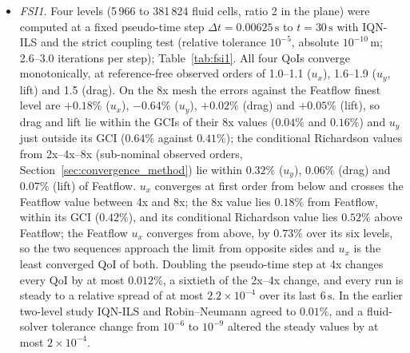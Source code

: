 \begin{itemize}
	\item \emph{FSI1.} Four levels (5\,966 to 381\,824 fluid cells, ratio 2 in the plane) were computed at a fixed pseudo-time step $\Delta t = 0.00625\,\mathrm{s}$ to $t = 30\,\mathrm{s}$ with IQN-ILS and the strict coupling test (relative tolerance $10^{-5}$, absolute $10^{-10}\,\mathrm{m}$; 2.6--3.0 iterations per step); Table~\ref{tab:fsi1}. All four QoIs converge monotonically, at reference-free observed orders of 1.0--1.1 ($u_x$), 1.6--1.9 ($u_y$, lift) and 1.5 (drag). On the 8x mesh the errors against the Featflow finest level are $+0.18\%$ ($u_x$), $-0.64\%$ ($u_y$), $+0.02\%$ (drag) and $+0.05\%$ (lift), so drag and lift lie within the GCIs of their 8x values ($0.04\%$ and $0.16\%$) and $u_y$ just outside its GCI ($0.64\%$ against $0.41\%$); the conditional Richardson values from 2x--4x--8x (sub-nominal observed orders, Section~\ref{sec:convergence_method}) lie within $0.32\%$ ($u_y$), $0.06\%$ (drag) and $0.07\%$ (lift) of Featflow. $u_x$ converges at first order from below and crosses the Featflow value between 4x and 8x; the 8x value lies $0.18\%$ from Featflow, within its GCI ($0.42\%$), and its conditional Richardson value lies $0.52\%$ above Featflow; the Featflow $u_x$ converges from above, by $0.73\%$ over its six levels, so the two sequences approach the limit from opposite sides and $u_x$ is the least converged QoI of both. Doubling the pseudo-time step at 4x changes every QoI by at most $0.012\%$, a sixtieth of the 2x--4x change, and every run is steady to a relative spread of at most $2.2\times10^{-4}$ over its last $6\,\mathrm{s}$. In the earlier two-level study IQN-ILS and Robin--Neumann agreed to $0.01\%$, and a fluid-solver tolerance change from $10^{-6}$ to $10^{-9}$ altered the steady values by at most $2\times10^{-4}$.


\end{itemize}
